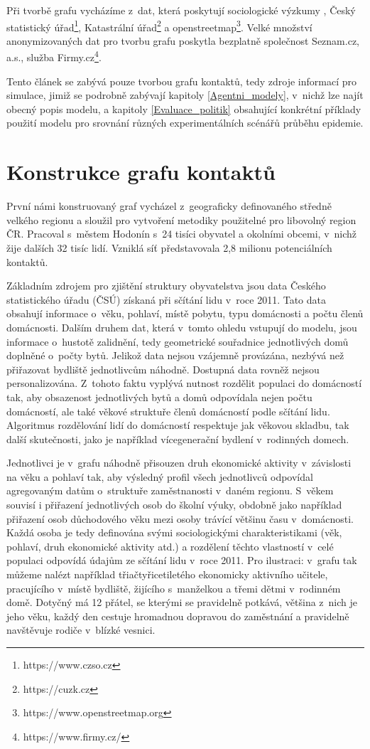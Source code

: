 Při tvorbě grafu vycházíme z~dat, která poskytují sociologické výzkumy \cite{paqcovid, zaj:mediancovid, zaj:medianlife}, Český statistický úřad\footnote{https://www.czso.cz}, Katastrální úřad\footnote{https://cuzk.cz} a openstreetmap\footnote{https://www.openstreetmap.org}. Velké množství anonymizovaných dat pro tvorbu grafu poskytla bezplatně společnost Seznam.cz, a.s., služba Firmy.cz\footnote{https://www.firmy.cz/}.

Tento článek se zabývá pouze tvorbou grafu kontaktů, tedy zdroje informací pro simulace, jimiž se podrobně zabývají kapitoly \ref{Agentni_modely}, v~nichž lze najít obecný popis modelu, a kapitoly \ref{Evaluace_politik} obsahující konkrétní příklady použití modelu pro srovnání různých experimentálních scénářů průběhu epidemie.

\section*{Konstrukce grafu kontaktů}

První námi konstruovaný graf vycházel z~geograficky definovaného středně velkého regionu a sloužil pro vytvoření metodiky použitelné pro libovolný region ČR. Pracoval s~městem Hodonín s~24 tisíci obyvatel a okolními obcemi, v~nichž žije dalších 32 tisíc lidí. Vzniklá síť představovala 2,8 milionu potenciálních kontaktů. 

Základním zdrojem pro zjištění struktury obyvatelstva jsou data Českého statistického úřadu (ČSÚ) získaná při sčítání lidu v~roce 2011. Tato data obsahují informace o~věku, pohlaví, místě pobytu, typu domácnosti a počtu členů domácnosti. Dalším druhem dat, která v~tomto ohledu vstupují do modelu, jsou informace o~hustotě zalidnění, tedy geometrické souřadnice jednotlivých domů doplněné o~počty bytů. Jelikož data nejsou vzájemně provázána, nezbývá než přiřazovat bydliště jednotlivcům náhodně. Dostupná data rovněž nejsou personalizována. Z~tohoto faktu vyplývá nutnost rozdělit populaci do domácností tak, aby obsazenost jednotlivých bytů a domů odpovídala nejen počtu domácností, ale také věkové struktuře členů domácností podle sčítání lidu. Algoritmus rozdělování lidí do domácností respektuje jak věkovou skladbu, tak další skutečnosti, jako je například vícegenerační bydlení v~rodinných domech.

Jednotlivci je v~grafu náhodně přisouzen druh ekonomické aktivity v~závislosti na věku a pohlaví tak, aby výsledný profil všech jednotlivců odpovídal agregovaným datům o~struktuře zaměstnanosti v~daném regionu. S~věkem souvisí i přiřazení jednotlivých osob do školní výuky, obdobně jako například přiřazení osob důchodového věku mezi osoby trávící většinu času v~domácnosti. Každá osoba je tedy definována svými sociologickými charakteristikami (věk, pohlaví, druh ekonomické aktivity atd.) a rozdělení těchto vlastností v~celé populaci odpovídá údajům ze sčítání lidu v~roce 2011. Pro ilustraci: v~grafu tak můžeme nalézt například třiačtyřicetiletého ekonomicky aktivního učitele, pracujícího v~místě bydliště, žijícího s~manželkou a třemi dětmi v~rodinném domě. Dotyčný má 12 přátel, se kterými se pravidelně potkává, většina z~nich je jeho věku, každý den cestuje hromadnou dopravou do zaměstnání a pravidelně navštěvuje rodiče v~blízké vesnici.

